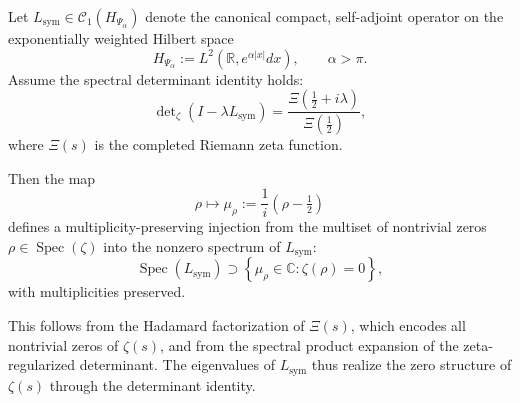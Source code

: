 \begin{lemma}
\label{lem:spectral_encoding_injection}

Let \( L_{\mathrm{sym}} \in \mathcal{C}_1(H_{\Psi_\alpha}) \) denote the canonical compact, self-adjoint operator on the exponentially weighted Hilbert space
\[
H_{\Psi_\alpha} := L^2(\mathbb{R}, e^{\alpha |x|} dx), \qquad \alpha > \pi.
\]
Assume the spectral determinant identity holds:
\[
\det\nolimits_{\zeta}(I - \lambda L_{\mathrm{sym}}) = \frac{\Xi\left( \tfrac{1}{2} + i\lambda \right)}{\Xi\left( \tfrac{1}{2} \right)},
\]
where \( \Xi(s) \) is the completed Riemann zeta function.

Then the map
\[
\rho \mapsto \mu_\rho := \frac{1}{i}(\rho - \tfrac{1}{2})
\]
defines a multiplicity-preserving injection from the multiset of nontrivial zeros \( \rho \in \operatorname{Spec}(\zeta) \) into the nonzero spectrum of \( L_{\mathrm{sym}} \):
\[
\operatorname{Spec}(L_{\mathrm{sym}}) \supset \left\{ \mu_\rho \in \mathbb{C} : \zeta(\rho) = 0 \right\},
\]
with multiplicities preserved.

\medskip

\noindent
This follows from the Hadamard factorization of \( \Xi(s) \), which encodes all nontrivial zeros of \( \zeta(s) \), and from the spectral product expansion of the zeta-regularized determinant. The eigenvalues of \( L_{\mathrm{sym}} \) thus realize the zero structure of \( \zeta(s) \) through the determinant identity.
\end{lemma}

